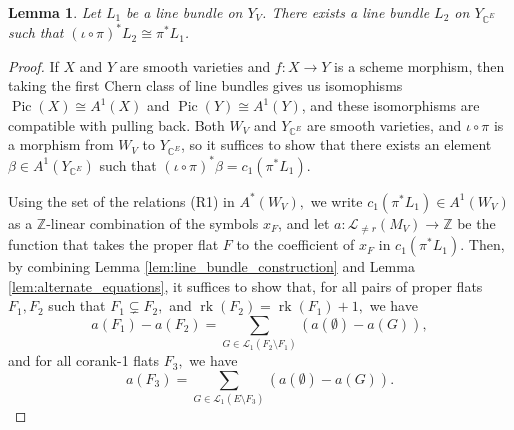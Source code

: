 \documentclass{amsart}
\theoremstyle{plain}
\newtheorem{lemma}[theorem]{Lemma}
\theoremstyle{definition}
\newcommand{\rk}{\operatorname{rk}}
\newcommand{\Pic}{\operatorname{Pic}}
\begin{document}
\begin{lemma}
\label{lem:conincidence_of_line_bundles}
    Let $L_1$ be a line bundle on $Y_V$. There exists a line bundle $L_2$ on $Y_{\mathbb{C}^E}$ such that $(\iota \circ \pi)^*L_2 \cong {\pi}^*L_1$.
\end{lemma}

\begin{proof}
If $X$ and $Y$ are smooth varieties and $f: X \to Y$ is a scheme morphism, then taking the first Chern class of line bundles gives us isomophisms $\Pic(X) \cong A^1(X)$ and $\Pic(Y) \cong A^1(Y)$, and these isomorphisms are compatible with pulling back. Both $W_V$ and $Y_{\mathbb{C}^E}$ are smooth varieties, and $\iota \circ \pi$ is a morphism from $W_V$ to $Y_{\mathbb{C}^E}$, so it suffices to show that there exists an element $\beta \in A^1(Y_{\mathbb{C}^E})$ such that $(\iota \circ\pi)^* \beta = c_1(\pi^*L_1).$ 

Using the set of the relations (R1) in $A^*(W_V),$ we write $c_1(\pi^*L_1)\in A^1(W_V)$ as a $\mathbb{Z}$-linear combination of the symbols $x_F$, and let $a: \mathcal{L}_{\neq r}(M_V) \to \mathbb{Z}$ be the function that takes the proper flat $F$ to the coefficient of $x_F$ in $c_1(\pi^*L_1).$ Then, by combining Lemma \ref{lem:line_bundle_construction} and Lemma \ref{lem:alternate_equations}, it suffices to show that, for all pairs of proper flats $F_1, F_2$ such that $F_1 \subsetneq F_2,$ and
$\rk(F_2) =\rk(F_1) + 1,$ we have
\begin{equation}
\label{eq:coincidence_of_line_bundles_1}
a(F_1) - a(F_2) = \sum_{G \in \mathcal{L}_1(F_2 \setminus F_1)}(a(\emptyset) - a(G)),
\end{equation}
and for all corank-1 flats $F_3,$ we have
\begin{equation}
\label{eq:coincidence_of_line_bundles_2}
a(F_3)=\sum_{G \in \mathcal{L}_1(E \setminus F_3)}(a(\emptyset) - a(G)).
\end{equation}


\end{proof}
\end{document}
